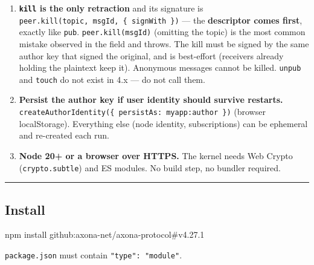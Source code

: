 \documentclass[
  nobib]{tufte-handout}
\newenvironment{Shaded}{}{}
\newcommand{\ExtensionTok}[1]{#1}
\newcommand{\NormalTok}[1]{#1}
\begin{document}
\begin{enumerate}
  ceiling). Re-publishing the identical payload from the same author
  yields the SAME msgId and refreshes the hold (an upsert; subscribers
  are not re-notified). Axona is a live messaging fabric, not permanent
  storage.
\item
  \textbf{\texttt{kill} is the only retraction} and its signature is
  \texttt{peer.kill(topic,\ msgId,\ \{\ signWith\ \})} --- the
  \textbf{descriptor comes first}, exactly like \texttt{pub}.
  \texttt{peer.kill(msgId)} (omitting the topic) is the most common
  mistake observed in the field and throws. The kill must be signed by
  the same author key that signed the original, and is best-effort
  (receivers already holding the plaintext keep it). Anonymous messages
  cannot be killed. \texttt{unpub} and \texttt{touch} do not exist in
  4.x --- do not call them.
\item
  \textbf{Persist the author key if user identity should survive
  restarts.}
  \texttt{createAuthorIdentity(\{\ persistAs:\ \textquotesingle{}myapp:author\textquotesingle{}\ \})}
  (browser localStorage). Everything else (node identity, subscriptions)
  can be ephemeral and re-created each run.
\item
  \textbf{Node 20+ or a browser over HTTPS.} The kernel needs Web Crypto
  (\texttt{crypto.subtle}) and ES modules. No build step, no bundler
  required.
\end{enumerate}

\begin{center}\rule{0.5\linewidth}{0.5pt}\end{center}

\subsection{Install}\label{install}

\begin{Shaded}
\begin{Highlighting}[]
\ExtensionTok{npm}\NormalTok{ install github:axona{-}net/axona{-}protocol\#v4.27.1}
\end{Highlighting}
\end{Shaded}

\texttt{package.json} must contain \texttt{"type":\ "module"}.
\end{document}
